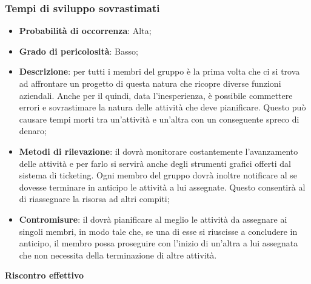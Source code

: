 		\subsubsection{Tempi di sviluppo sovrastimati} %
		\label{ssub:tempi_di_sviluppo_sovrastimati}
			\begin{itemize}
				\item \textbf{Probabilità di occorrenza}: Alta;
				\item \textbf{Grado di pericolosità}: Basso;
				\item \textbf{Descrizione}: per tutti i membri del gruppo è la prima volta che ci si trova ad affrontare un progetto di questa natura che ricopre diverse funzioni aziendali. Anche per il \roleProjectManager{} quindi, data l'inesperienza, è possibile commettere errori e sovrastimare la natura delle attività che deve pianificare. Questo può causare tempi morti tra un'attività e un'altra con un conseguente spreco di denaro;
				\item \textbf{Metodi di rilevazione}: il \roleProjectManager{} dovrà monitorare costantemente l'avanzamento delle attività e per farlo si servirà anche degli strumenti grafici offerti dal sistema di ticketing. Ogni membro del gruppo dovrà inoltre notificare al \roleProjectManager{} se dovesse terminare in anticipo le attività a lui assegnate. Questo consentirà al \roleProjectManager{} di riassegnare la risorsa ad altri compiti;
				\item \textbf{Contromisure}: il \roleProjectManager{} dovrà pianificare al meglio le attività da assegnare ai singoli membri, in modo tale che, se una di esse si riuscisse a concludere in anticipo, il membro possa proseguire con l'inizio di un'altra a lui assegnata che non necessita della terminazione di altre attività.
			\end{itemize}
		\noindent
		\textbf{Riscontro effettivo}
